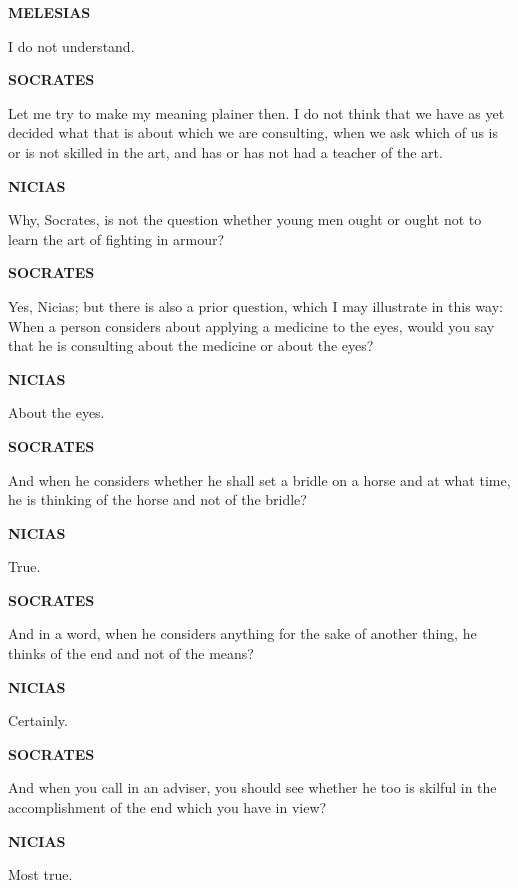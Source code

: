 \documentclass[11pt,letter]{article}
\begin{document}
\par \textbf{MELESIAS}
\par   I do not understand.

\par \textbf{SOCRATES}
\par   Let me try to make my meaning plainer then. I do not think that we have as yet decided what that is about which we are consulting, when we ask which of us is or is not skilled in the art, and has or has not had a teacher of the art.

\par \textbf{NICIAS}
\par   Why, Socrates, is not the question whether young men ought or ought not to learn the art of fighting in armour?

\par \textbf{SOCRATES}
\par   Yes, Nicias; but there is also a prior question, which I may illustrate in this way:  When a person considers about applying a medicine to the eyes, would you say that he is consulting about the medicine or about the eyes?

\par \textbf{NICIAS}
\par   About the eyes.

\par \textbf{SOCRATES}
\par   And when he considers whether he shall set a bridle on a horse and at what time, he is thinking of the horse and not of the bridle?

\par \textbf{NICIAS}
\par   True.

\par \textbf{SOCRATES}
\par   And in a word, when he considers anything for the sake of another thing, he thinks of the end and not of the means?

\par \textbf{NICIAS}
\par   Certainly.

\par \textbf{SOCRATES}
\par   And when you call in an adviser, you should see whether he too is skilful in the accomplishment of the end which you have in view?

\par \textbf{NICIAS}
\par   Most true.
\end{document}
